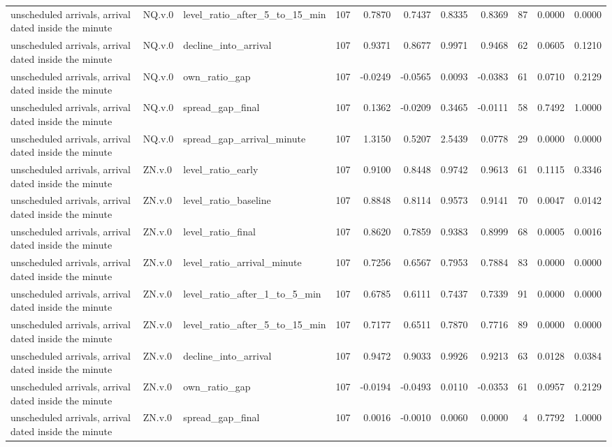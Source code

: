 \begin{tabular}{lllrrrrrrrr}
unscheduled arrivals, arrival dated inside the minute & NQ.v.0 & level_ratio_after_5_to_15_min & 107 & 0.7870 & 0.7437 & 0.8335 & 0.8369 & 87 & 0.0000 & 0.0000 \\
unscheduled arrivals, arrival dated inside the minute & NQ.v.0 & decline_into_arrival & 107 & 0.9371 & 0.8677 & 0.9971 & 0.9468 & 62 & 0.0605 & 0.1210 \\
unscheduled arrivals, arrival dated inside the minute & NQ.v.0 & own_ratio_gap & 107 & -0.0249 & -0.0565 & 0.0093 & -0.0383 & 61 & 0.0710 & 0.2129 \\
unscheduled arrivals, arrival dated inside the minute & NQ.v.0 & spread_gap_final & 107 & 0.1362 & -0.0209 & 0.3465 & -0.0111 & 58 & 0.7492 & 1.0000 \\
unscheduled arrivals, arrival dated inside the minute & NQ.v.0 & spread_gap_arrival_minute & 107 & 1.3150 & 0.5207 & 2.5439 & 0.0778 & 29 & 0.0000 & 0.0000 \\
unscheduled arrivals, arrival dated inside the minute & ZN.v.0 & level_ratio_early & 107 & 0.9100 & 0.8448 & 0.9742 & 0.9613 & 61 & 0.1115 & 0.3346 \\
unscheduled arrivals, arrival dated inside the minute & ZN.v.0 & level_ratio_baseline & 107 & 0.8848 & 0.8114 & 0.9573 & 0.9141 & 70 & 0.0047 & 0.0142 \\
unscheduled arrivals, arrival dated inside the minute & ZN.v.0 & level_ratio_final & 107 & 0.8620 & 0.7859 & 0.9383 & 0.8999 & 68 & 0.0005 & 0.0016 \\
unscheduled arrivals, arrival dated inside the minute & ZN.v.0 & level_ratio_arrival_minute & 107 & 0.7256 & 0.6567 & 0.7953 & 0.7884 & 83 & 0.0000 & 0.0000 \\
unscheduled arrivals, arrival dated inside the minute & ZN.v.0 & level_ratio_after_1_to_5_min & 107 & 0.6785 & 0.6111 & 0.7437 & 0.7339 & 91 & 0.0000 & 0.0000 \\
unscheduled arrivals, arrival dated inside the minute & ZN.v.0 & level_ratio_after_5_to_15_min & 107 & 0.7177 & 0.6511 & 0.7870 & 0.7716 & 89 & 0.0000 & 0.0000 \\
unscheduled arrivals, arrival dated inside the minute & ZN.v.0 & decline_into_arrival & 107 & 0.9472 & 0.9033 & 0.9926 & 0.9213 & 63 & 0.0128 & 0.0384 \\
unscheduled arrivals, arrival dated inside the minute & ZN.v.0 & own_ratio_gap & 107 & -0.0194 & -0.0493 & 0.0110 & -0.0353 & 61 & 0.0957 & 0.2129 \\
unscheduled arrivals, arrival dated inside the minute & ZN.v.0 & spread_gap_final & 107 & 0.0016 & -0.0010 & 0.0060 & 0.0000 & 4 & 0.7792 & 1.0000 \\

\end{tabular}
